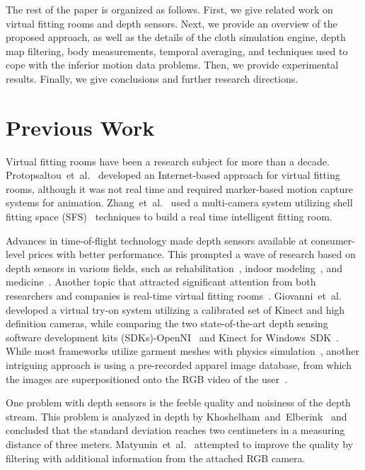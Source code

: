 \documentclass[number,preprint,review,12pt]{elsarticle}
\begin{document}
The rest of the paper is organized as follows. First, we give related work on virtual fitting rooms and depth sensors. Next, we provide an overview of the proposed approach, as well as the details of the cloth simulation engine, depth map filtering, body measurements, temporal averaging, and techniques used to cope with the inferior motion data problems. Then, we provide experimental results. Finally, we give conclusions and further research directions. 

\section{Previous Work}
\label{sec:Related}
Virtual fitting rooms have been a research subject for more than a decade. Protopsaltou~et~al.~\cite{Protopsaltou2002} developed an Inter\-net-based approach for virtual fitting rooms, although it was not real time and required marker-based motion capture systems for animation. Zhang~et~al.~\cite{Zhang2008} used a multi-camera system utilizing shell fitting space (SFS)~\cite{Cheung2005} techniques to build a real time intelligent fitting room.

Advances in time-of-flight technology made depth sensors available at consumer-level prices with better performance. This prompted a wave of research based on depth sensors in various fields, such as rehabilitation~\cite{Changa2011}, indoor modeling~\cite{Henry2012}, and medicine~\cite{Gallo2012}. Another topic that attracted significant attention from both researchers and companies is real-time virtual fitting rooms~\cite{Meng2010}. Giovanni~et~al.~\cite{Giovanni2012} developed a virtual try-on system utilizing a calibrated set of Kinect and high definition cameras, while comparing the two state-of-the-art depth sensing software development kits (SDKs)-OpenNI~\cite{OpenNI2013} and Kinect for Windows~SDK~\cite{Microsoft2013}. While most frameworks utilize garment meshes with physics simulation~\cite{Fitnect2012,Styku2013}, another intriguing approach is using a pre-recorded apparel image database, from which the images are superpositioned onto the RGB video of the user~\cite{Hauswiesner2013,Zhou2012}. 

One problem with depth sensors is the feeble quality and noisiness of the depth stream. This problem is analyzed in depth by Khoshelham~and~Elberink~\cite{Khoshelham2012} and concluded that the standard deviation reaches two centimeters in a measuring distance of three meters. Matyunin~et~al.~\cite{Matyunin2011} attempted to improve the quality by filtering with additional information from the attached RGB camera.  
\end{document}
